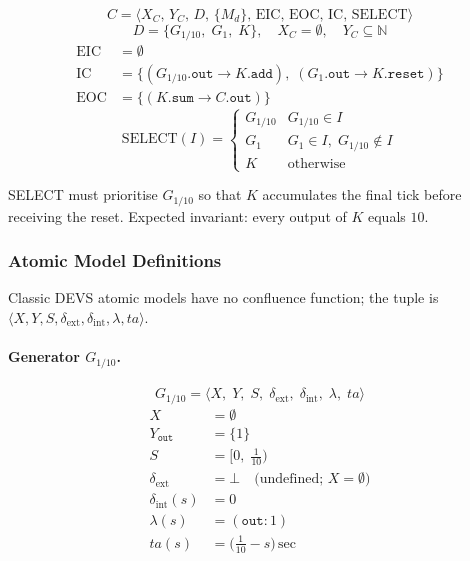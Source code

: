 \[
  C = \langle X_C,\, Y_C,\, D,\, \{M_d\},\, \text{EIC},\, \text{EOC},\,
      \text{IC},\, \text{SELECT} \rangle
\]
\[
  D = \{G_{1/10},\; G_{1},\; K\},\quad X_C = \emptyset,\quad Y_C \subseteq \mathbb{N}
\]
\begin{align*}
  \text{EIC}  &= \emptyset \\
  \text{IC}   &= \{(G_{1/10}.\texttt{out} \to K.\texttt{add}),\;
                   (G_{1}.\texttt{out} \to K.\texttt{reset})\} \\
  \text{EOC}  &= \{(K.\texttt{sum} \to C.\texttt{out})\}
\end{align*}
\[
  \text{SELECT}(I) =
  \begin{cases}
    G_{1/10} & G_{1/10} \in I \\
    G_{1}    & G_{1} \in I,\; G_{1/10} \notin I \\
    K        & \text{otherwise}
  \end{cases}
\]

SELECT must prioritise $G_{1/10}$ so that $K$ accumulates the final
tick before receiving the reset.  Expected invariant: every output
of $K$ equals $10$.

\subsubsection*{Atomic Model Definitions}

Classic DEVS atomic models have no confluence function; the tuple is
$\langle X, Y, S, \delta_{\text{ext}}, \delta_{\text{int}}, \lambda, ta \rangle$.

\paragraph{Generator $G_{1/10}$.}

\[
  G_{1/10} = \langle X,\; Y,\; S,\;
               \delta_{\text{ext}},\; \delta_{\text{int}},\;
               \lambda,\; ta \rangle
\]
\begin{align*}
  X &= \emptyset \\
  Y_{\texttt{out}} &= \{1\} \\
  S &= \bigl[0,\;\tfrac{1}{10}\bigr) \\
  \delta_{\text{ext}} &= \bot
    \quad\text{(undefined; } X = \emptyset\text{)} \\
  \delta_{\text{int}}(s) &= 0 \\
  \lambda(s) &= (\texttt{out}: 1) \\
  ta(s) &= \bigl(\tfrac{1}{10} - s\bigr)\,\text{sec}
\end{align*}


